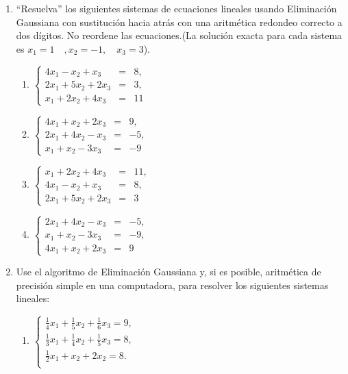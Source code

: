 \documentclass[12pt,letterpaper]{article}
\theoremstyle{plain}
\begin{document}
\begin{enumerate}
 \item ``Resuelva'' los siguientes sistemas de ecuaciones lineales usando Eliminaci\'on Gaussiana con sustituci\'on hacia atr\'as con una aritm\'etica redondeo correcto a dos d\'igitos. No reordene las ecuaciones.(La soluci\'on exacta para cada sistema es $x_1=1\quad,x_2=-1,\quad x_3=3$).
\begin{multicols}{2}
\begin{enumerate}
 \item $\left\{\begin{array}{lcc}
         4x_1-x_2+x_3&=&8,\\
         2x_1+5x_2+2x_3&=&3,\\
         x_1+2x_2+4x_3&=&11
        \end{array}\right.$

 \item $\left\{\begin{array}{ccc}
         4x_1+x_2+2x_3&=&9,\\
         2x_1+4x_2-x_3&=&-5,\\
         x_1+x_2-3x_3&=&-9
        \end{array}\right.$


 \item $\left\{\begin{array}{ccc}
         x_1+2x_2+4x_3&=&11,\\
         4x_1-x_2+x_3&=&8,\\
         2x_1+5x_2+2x_3&=&3
        \end{array}\right.$

 \item $\left\{\begin{array}{ccc}
         2x_1+4x_2-x_3&=&-5,\\
         x_1+x_2-3x_3&=&-9,\\
         4x_1+x_2+2x_3&=&9
        \end{array}\right.$
\end{enumerate}
\end{multicols}

\item Use el algoritmo de Eliminaci\'on Gaussiana y, si es posible, aritm\'etica de precisi\'on simple en una computadora, para resolver los siguientes sistemas lineales:
\begin{multicols}{2}
\begin{enumerate}
 \item $\left\{\begin{array}{l}
         \frac{1}{4}x_1+\frac{1}{5}x_2+\frac{1}{6}x_3 = 9,\\
         \frac{1}{3}x_1+\frac{1}{4}x_2+\frac{1}{5}x_3 = 8,\\
         \frac{1}{2}x_1+x_2+2x_2 = 8.\\
        \end{array}\right.$


\end{enumerate}
\end{multicols}
\end{enumerate}
\end{document}
